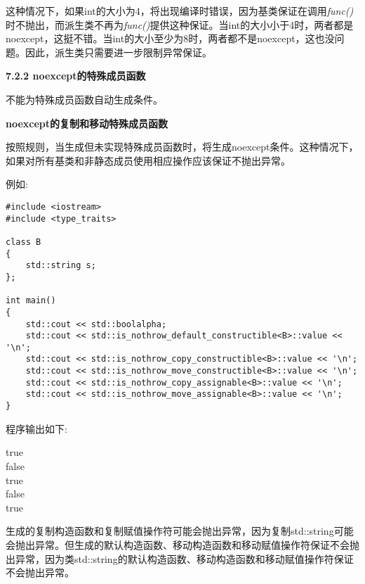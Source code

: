 这种情况下，如果int的大小为4，将出现编译时错误，因为基类保证在调用\textit{func()}时不抛出，而派生类不再为\textit{func()}提供这种保证。当int的大小小于4时，两者都是noexcept，这挺不错。当int的大小至少为8时，两者都不是noexcept，这也没问题。因此，派生类只需要进一步限制异常保证。\par

\hspace*{\fill} \par %
\textbf{7.2.2 noexcept的特殊成员函数}

不能为特殊成员函数自动生成条件。\par

\hspace*{\fill} \par %
\textbf{noexcept的复制和移动特殊成员函数}

按照规则，当生成但未实现特殊成员函数时，将生成noexcept条件。这种情况下，如果对所有基类和非静态成员使用相应操作应该保证不抛出异常。\par

例如:\par

{\color{red}{basics/specialnoexcept.cpp}}\par

\begin{lstlisting}[caption={}]
#include <iostream>
#include <type_traits>

class B
{
	std::string s;
};

int main()
{
	std::cout << std::boolalpha;
	std::cout << std::is_nothrow_default_constructible<B>::value << '\n';
	std::cout << std::is_nothrow_copy_constructible<B>::value << '\n';
	std::cout << std::is_nothrow_move_constructible<B>::value << '\n';
	std::cout << std::is_nothrow_copy_assignable<B>::value << '\n';
	std::cout << std::is_nothrow_move_assignable<B>::value << '\n';
}
\end{lstlisting}

程序输出如下:\par

\begin{tcolorbox}[colback=white,colframe=black]
true \\
false \\
true \\ 
false \\
true 
\end{tcolorbox}

生成的复制构造函数和复制赋值操作符可能会抛出异常，因为复制std::string可能会抛出异常。但生成的默认构造函数、移动构造函数和移动赋值操作符保证不会抛出异常，因为类std::string的默认构造函数、移动构造函数和移动赋值操作符保证不会抛出异常。\par

